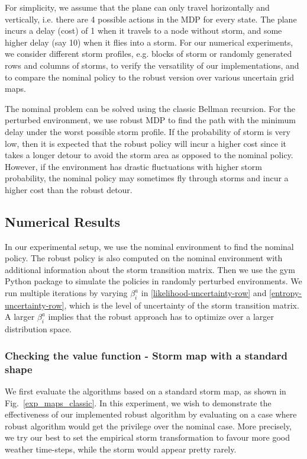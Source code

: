 \documentclass[11pt,reqno]{amsart}
\theoremstyle{definition}
\numberwithin{equation}{section}
\theoremstyle{remark}
\begin{document}
\medskip

For simplicity, we assume that the plane can only travel horizontally and vertically, i.e. there are 4 possible actions in the MDP for every state. The plane incurs a delay (cost) of 1 when it travels to a node without storm, and some higher delay (say 10) when it flies into a storm. For our numerical experiments, we consider different storm profiles, e.g. blocks of storm or randomly generated rows and columns of storms, to verify the versatility of our implementations, and to compare the nominal policy to the robust version over various uncertain grid maps.

\medskip

The nominal problem can be solved using the classic Bellman recursion. For the perturbed environment, we use robust MDP to find the path with the minimum delay under the worst possible storm profile. If the probability of storm is very low, then it is expected that the robust policy will incur a higher cost since it takes a longer detour to avoid the storm area as opposed to the nominal policy. However, if the environment has drastic fluctuations with higher storm probability, the nominal policy may sometimes fly through storms and incur a higher cost than the robust detour.


\subsection{Numerical Results}

In our experimental setup, we use the nominal environment to find the nominal policy. The robust policy is also computed on the nominal environment with additional information about the storm transition matrix. Then we use the gym Python package to simulate the policies in randomly perturbed environments. We run multiple iterations by varying $\beta_i^a$ in \ref{likelihood-uncertainty-row} and \ref{entropy-uncertainty-row}, which is the level of uncertainty of the storm transition matrix. A larger $\beta_i^a$ implies that the robust approach has to optimize over a larger distribution space.

\subsubsection{Checking the value function - Storm map with a standard shape}
\label{exp_classic}

We first evaluate the algorithms based on a standard storm map, as shown in Fig.~\ref{exp_maps_classic}. In this experiment, we wish to demonstrate the effectiveness of our implemented robust algorithm by evaluating on a case where robust algorithm would get the privilege over the nominal case. More precisely, we try our best to set the empirical storm transformation to favour more good weather time-steps, while the storm would appear pretty rarely. 
\end{document}
